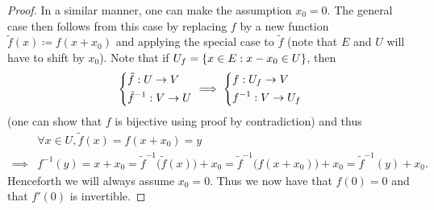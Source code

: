 \begin{proof}
  In a similar manner, one can make the assumption \(x_0 = 0\).
  The general case then follows from this case by replacing \(f\) by a new function
  \(\tilde{f}(x) \coloneqq f(x + x_0)\) and applying the special case to \(\tilde{f}\)
  (note that \(E\) and \(U\) will have to shift by \(x_0\)).
  Note that if \(U_f = \left\lbrace x \in E : x - x_0 \in U\right\rbrace\), then
  \[
    \begin{dcases}
      \tilde{f} : U \to V \\
      \tilde{f}^{-1} : V \to U
    \end{dcases} \implies \begin{dcases}
      f : U_f \to V \\
      f^{-1} : V \to U_f
    \end{dcases}
  \]
  (one can show that \(f\) is bijective using proof by contradiction)
  and thus
  \begin{align*}
             & \forall x \in U, \tilde{f}(x) = f(x + x_0) = y                                                                                         \\
    \implies & f^{-1}(y) = x + x_0 = \tilde{f}^{-1}\big(\tilde{f}(x)\big) + x_0 = \tilde{f}^{-1}\big(f(x + x_0)\big) + x_0 = \tilde{f}^{-1}(y) + x_0.
  \end{align*}
  Henceforth we will always assume \(x_0 = 0\).
  Thus we now have that \(f(0) = 0\) and that \(f'(0)\) is invertible.


\end{proof}
